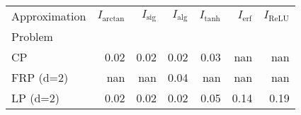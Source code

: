 \begin{tabular}{lrrrrrr}
Approximation & $I_\text{arctan}$ & $I_\text{sig}$ & $I_\text{alg}$ & $I_\text{tanh}$ & $I_\text{erf}$ & $I_\text{ReLU}$ \\
Problem &  &  &  &  &  &  \\
CP & 0.02 & 0.02 & 0.02 & 0.03 & nan & nan \\
\cline{1-7}
FRP (d=2) & nan & nan & 0.04 & nan & nan & nan \\
\cline{1-7}
LP (d=2) & 0.02 & 0.02 & 0.02 & 0.05 & 0.14 & 0.19 \\
\cline{1-7}
\end{tabular}

